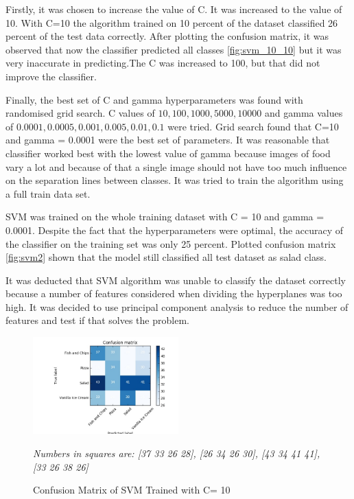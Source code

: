 Firstly, it was chosen to increase the value of C. It was increased to the value of 10. With C=10 the algorithm trained on 10 percent of the dataset classified 26 percent of the test data correctly. After plotting the confusion matrix, it was observed that now the classifier predicted all classes \autoref{fig:svm_10_10} but it was very inaccurate in predicting.The C was increased to 100, but that did not improve the classifier.

Finally, the best set of C and gamma hyperparameters was found with randomised grid search. C values of  \(10, 100, 1000, 5000, 10000\) and gamma values  of \(0.0001, 0.0005, 0.001, 0.005, 0.01, 0.1\) were tried. Grid search found that C=10 and gamma = 0.0001 were the best set of parameters. It was reasonable that classifier worked best with the lowest value of gamma because images of food vary a lot and because of that a single image should not have too much influence on the separation lines between classes. It was tried to train the algorithm using a full train data set.

SVM was trained on the whole training dataset with C = 10 and gamma = 0.0001. Despite the fact that the hyperparameters were optimal, the accuracy of the classifier on the training set was only 25 percent. Plotted confusion matrix \autoref{fig:svm2} shown that the model still classified all test dataset as salad class. 

It was deducted that SVM algorithm was unable to classify the dataset correctly because a number of features considered when dividing the hyperplanes was too high. It was decided to use principal component analysis to reduce the number of features and test if that solves the problem.


\begin{figure}[h]
\centering
\includegraphics[width=0.5\textwidth]{Figures/svm_10_10.jpg}
\caption{Confusion Matrix of SVM Trained with C= 10}
 \textit{Numbers in squares are: [37 33 26 28],
 [26 34 26 30],
 [43 34 41 41],
 [33 26 38 26]}
\label{fig:svm_10_10}
\end{figure}

